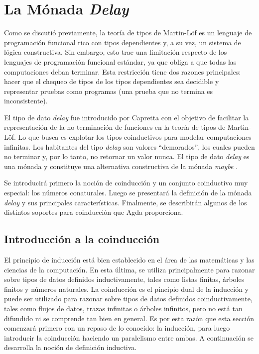 \chapter{La Mónada \textit{Delay}}\label{chapter:delay}

Como se discutió previamente, la teoría de tipos de Martin-Löf es un lenguaje de programación funcional rico con tipos dependientes y, a su vez, un sistema de lógica constructiva. Sin embargo, esto trae una limitación respecto de los lenguajes de programación funcional estándar, ya que obliga a que todas las computaciones deban terminar. Esta restricción tiene dos razones principales: hacer que el chequeo de tipos de los tipos dependientes sea decidible y representar pruebas como programas (una prueba que no termina es inconsistente). 

El tipo de dato \textit{delay} fue introducido por Capretta \cite{capretta:2005} con el objetivo de facilitar la representación de la no-terminación de funciones en la teoría de tipos de Martin-Löf. Lo que busca es explotar los tipos coinductivos para modelar computaciones infinitas. Los habitantes del tipo \textit{delay} son valores ``demorados'', los cuales pueden no terminar y, por lo tanto, no retornar un valor nunca. El tipo de dato \textit{delay} es una mónada y constituye una alternativa constructiva de la mónada \textit{maybe} \cite[\S 3]{capretta:2005}. 

Se introducirá primero la noción de coinducción y un conjunto coinductivo muy especial: los números conaturales. Luego se presentará la definición de la mónada \textit{delay} y sus principales características. Finalmente, se describirán algunos de los distintos soportes para coinducción que Agda proporciona. 

\section{Introducción a la coinducción}\label{delay:coind}

El principio de inducción está bien establecido en el área de las matemáticas y las ciencias de la computación. En esta última, se utiliza principalmente para razonar sobre tipos de datos definidos inductivamente, tales como listas finitas, árboles finitos y números naturales. La coinducción es el pincipio dual de la inducción y puede ser utilizado para razonar sobre tipos de datos definidos coinductivamente, tales como flujos de datos, trazas infinitas o árboles infinitos, pero no está tan difundido ni se comprende tan bien en general. Es por esta razón que esta sección comenzará primero con un repaso de lo conocido: la inducción, para luego introducir la coinducción haciendo un paralelismo entre ambas. A continuación se desarrolla la noción de definición inductiva. 

